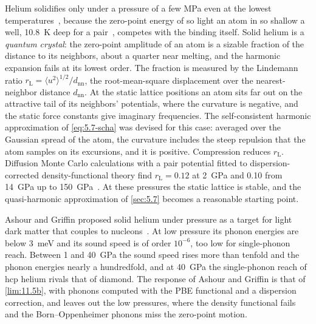 Helium solidifies only under a pressure of a few MPa even at the lowest temperatures~\cite{ashour2024pressure}, because the zero-point energy of so light an atom in so shallow a well, \SI{10.8}{K} deep for a pair~\cite{aziz1979accurate}, competes with the binding itself. Solid helium is a \emph{quantum crystal}: the zero-point amplitude of an atom is a sizable fraction of the distance to its neighbors, about a quarter near melting, and the harmonic expansion fails at its lowest order. The fraction is measured by the Lindemann ratio $r_{\mathrm{L}} = \langle u^2\rangle^{1/2}/d_{\mathrm{nn}}$, the root-mean-square displacement over the nearest-neighbor distance $d_{\mathrm{nn}}$. At the static lattice positions an atom sits far out on the attractive tail of its neighbors' potentials, where the curvature is negative, and the static force constants give imaginary frequencies. The self-consistent harmonic approximation of \cref{eq:5.7-scha} was devised for this case: averaged over the Gaussian spread of the atom, the curvature includes the steep repulsion that the atom samples on its excursions, and it is positive. Compression reduces $r_{\mathrm{L}}$. Diffusion Monte Carlo calculations with a pair potential fitted to dispersion-corrected density-functional theory find $r_{\mathrm{L}} = 0.12$ at \SI{2}{GPa} and 0.10 from \SI{14}{GPa} up to \SI{150}{GPa}~\cite[Table~I]{cazorla2015first}. At these pressures the static lattice is stable, and the quasi-harmonic approximation of \cref{sec:5.7} becomes a reasonable starting point.

Ashour and Griffin proposed solid helium under pressure as a target for light dark matter that couples to nucleons~\cite{ashour2024pressure}. At low pressure its phonon energies are below \SI{3}{meV} and its sound speed is of order $10^{-6}$, too low for single-phonon reach. Between 1 and \SI{40}{GPa} the sound speed rises more than tenfold and the phonon energies nearly a hundredfold, and at \SI{40}{GPa} the single-phonon reach of hcp helium rivals that of diamond. The response of Ashour and Griffin is that of \cref{lim:11.5b}, with phonons computed with the PBE functional and a dispersion correction, and leaves out the low pressures, where the density functional fails and the Born--Oppenheimer phonons miss the zero-point motion.


